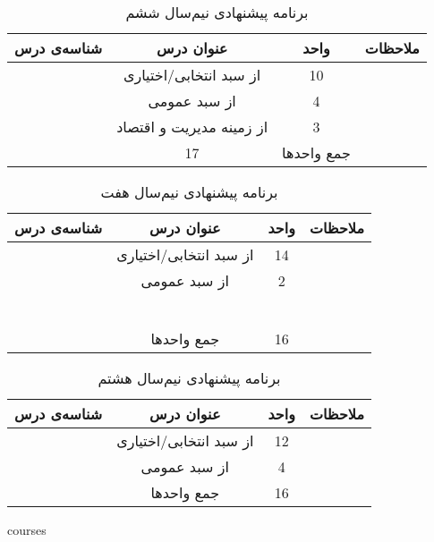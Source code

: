 \documentclass{article}
\begin{document}
\begin{table}[H]
\begin{center}
\begin{tabular}{|c|c|c|c|}
	\hline
	شناسه‌ی درس & عنوان درس & واحد & ملاحظات \\
	\hline
	& از سبد انتخابی/اختیاری & 10 &  \\
	\hline
	& از سبد عمومی & 4 &  \\
	\hline
	& از زمینه مدیریت و اقتصاد & 3 &  \\
	\hline
	& 17 & جمع واحدها & \\
	\hline
\end{tabular}
	\caption{\label{cs-t11}
برنامه پیشنهادی نیم‌سال ششم
}
\end{center}
\end{table}
\begin{table}[H]
\begin{center}
\begin{tabular}{|c|c|c|c|}
	\hline
	شناسه‌ی درس & عنوان درس & واحد & ملاحظات \\
	\hline
	& از سبد انتخابی/اختیاری & 14 &  \\
	\hline
	& از سبد عمومی & 2 &  \\
	\hline
	&  &  &  \\
	\hline
	&  &  &  \\
	\hline
	&  &  &  \\
	\hline
	&  &  &  \\
	\hline
	&  &  &  \\
	\hline
	&  &  &  \\
	\hline
	& جمع واحدها & 16 &  \\
	\hline
\end{tabular}
\caption{\label{cs-t12}
برنامه پیشنهادی نیم‌سال هفت
}
\end{center}
\end{table}
\begin{table}[H]
\begin{center}
\begin{tabular}{|c|c|c|c|}
	\hline
	شناسه‌ی درس & عنوان درس &     واحد    & ملاحظات \\
	\hline
	& از سبد انتخابی/اختیاری & 12 &  \\
	\hline
	& از سبد عمومی & 4 &  \\
	\hline
	& جمع واحدها & 16 &  \\
	\hline
\end{tabular}
\caption{\label{cs-t13}
برنامه پیشنهادی نیم‌سال هشتم
}
\end{center}
\end{table}

\pagebreak
{courses}
\end{document}
